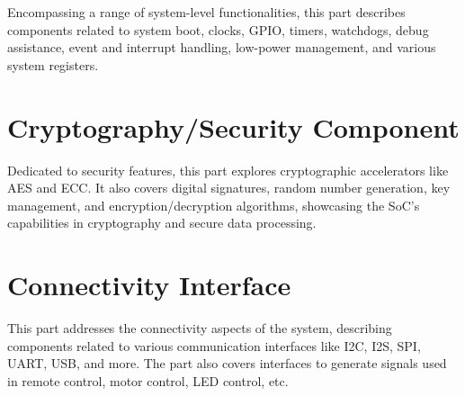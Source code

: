 \documentclass[openany, 10pt]{book}
\begin{document}

Encompassing a range of system-level functionalities, this part describes components related to system boot, clocks, GPIO, timers, watchdogs, debug assistance, event and interrupt handling, low-power management, and various system registers.


\part{Cryptography/Security Component}

Dedicated to security features, this part explores cryptographic accelerators like AES and ECC. It also covers digital signatures, random number generation, key management, and encryption/decryption algorithms, showcasing the SoC’s capabilities in cryptography and secure data processing.



\part{Connectivity Interface}


This part addresses the connectivity aspects of the system, describing components related to various communication interfaces like I2C, I2S, SPI, UART, USB, and more. The part also covers interfaces to generate signals used in remote control, motor control, LED control, etc.
\end{document}
